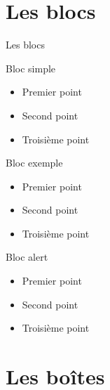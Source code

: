 \documentclass{bredelebeamer}
\begin{document}
    \section{Les blocs}

    \begin{frame}{Les blocs}

        \begin{block}{Bloc simple}
            \begin{itemize}
                \item Premier point
                \item Second point
                \item Troisième point
            \end{itemize}
        \end{block}

        \begin{exampleblock}{Bloc exemple}
            \begin{itemize}
                \item Premier point
                \item Second point
                \item Troisième point
            \end{itemize}
        \end{exampleblock}

        \begin{alertblock}{Bloc alert}
            \begin{itemize}
                \item Premier point
                \item Second point
                \item Troisième point
            \end{itemize}
        \end{alertblock}
    \end{frame}


    \section{Les bo\^ites}
\end{document}
